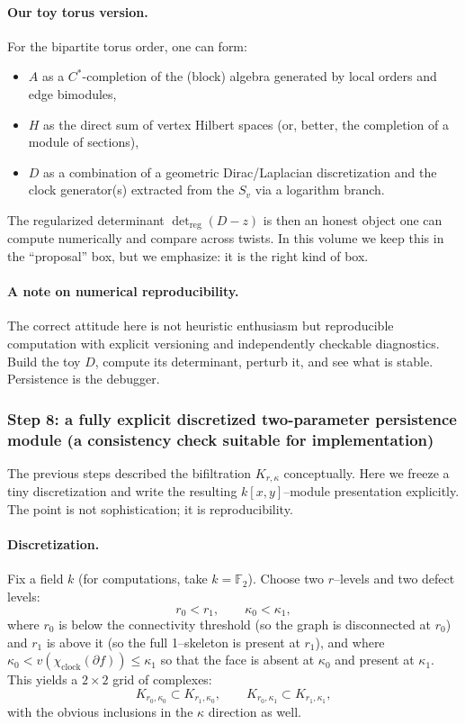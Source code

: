 \documentclass[11pt,oneside]{amsbook}
\numberwithin{equation}{section}
\theoremstyle{plain}
\theoremstyle{definition}
\theoremstyle{remark}
\newcommand{\F}{\mathbb{F}}
\begin{document}
\paragraph{Our toy torus version.}
For the bipartite torus order, one can form:
\begin{itemize}
\item $A$ as a $C^\ast$-completion of the (block) algebra generated by local orders and edge bimodules,
\item $H$ as the direct sum of vertex Hilbert spaces (or, better, the completion of a module of sections),
\item $D$ as a combination of a geometric Dirac/Laplacian discretization and the clock generator(s) extracted from the $S_v$ via a logarithm branch.
\end{itemize}
The regularized determinant $\det_{\mathrm{reg}}(D-z)$ is then an honest object one can compute numerically and compare across twists.
In this volume we keep this in the ``proposal'' box, but we emphasize: it is the right kind of box.

\paragraph{A note on numerical reproducibility.}
The correct attitude here is not heuristic enthusiasm but reproducible computation with explicit versioning and independently checkable diagnostics.
Build the toy $D$, compute its determinant, perturb it, and see what is stable.
Persistence is the debugger.

\subsubsection{Step 8: a fully explicit discretized two-parameter persistence module (a consistency check suitable for implementation)}
\label{sec:bipartite_step8_persistence}

The previous steps described the bifiltration $K_{r,\kappa}$ conceptually.
Here we freeze a tiny discretization and write the resulting $k[x,y]$--module presentation explicitly.
The point is not sophistication; it is reproducibility.

\paragraph{Discretization.}
Fix a field $k$ (for computations, take $k=\F_2$).
Choose two $r$--levels and two defect levels:
\[
r_0<r_1,\qquad \kappa_0<\kappa_1,
\]
where $r_0$ is below the connectivity threshold (so the graph is disconnected at $r_0$) and $r_1$ is above it (so the full 1--skeleton is present at $r_1$),
and where $\kappa_0< v(\chi_{\mathrm{clock}}(\partial f))\le \kappa_1$ so that the face is absent at $\kappa_0$ and present at $\kappa_1$.
This yields a $2\times 2$ grid of complexes:
\[
K_{r_0,\kappa_0}\subset K_{r_1,\kappa_0},\qquad
K_{r_0,\kappa_1}\subset K_{r_1,\kappa_1},
\]
with the obvious inclusions in the $\kappa$ direction as well.
\end{document}
